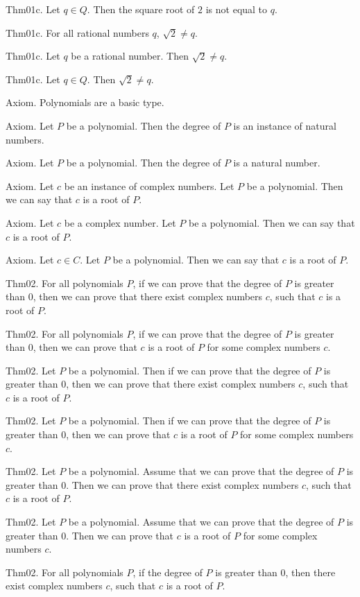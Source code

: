 \documentclass{article}
\begin{document}
Thm01c. Let $q \in Q$. Then the square root of $2$ is not equal to $q$.

Thm01c. For all rational numbers $q$, $\sqrt{ 2}\neq q$.

Thm01c. Let $q$ be a rational number. Then $\sqrt{ 2}\neq q$.

Thm01c. Let $q \in Q$. Then $\sqrt{ 2}\neq q$.

Axiom. Polynomials are a basic type.

Axiom. Let $P$ be a polynomial. Then the degree of $P$ is an instance of natural numbers.

Axiom. Let $P$ be a polynomial. Then the degree of $P$ is a natural number.

Axiom. Let $c$ be an instance of complex numbers. Let $P$ be a polynomial. Then we can say that $c$ is a root of $P$.

Axiom. Let $c$ be a complex number. Let $P$ be a polynomial. Then we can say that $c$ is a root of $P$.

Axiom. Let $c \in C$. Let $P$ be a polynomial. Then we can say that $c$ is a root of $P$.

Thm02. For all polynomials $P$, if we can prove that the degree of $P$ is greater than $0$, then we can prove that there exist complex numbers $c$, such that $c$ is a root of $P$.

Thm02. For all polynomials $P$, if we can prove that the degree of $P$ is greater than $0$, then we can prove that $c$ is a root of $P$ for some complex numbers $c$.

Thm02. Let $P$ be a polynomial. Then if we can prove that the degree of $P$ is greater than $0$, then we can prove that there exist complex numbers $c$, such that $c$ is a root of $P$.

Thm02. Let $P$ be a polynomial. Then if we can prove that the degree of $P$ is greater than $0$, then we can prove that $c$ is a root of $P$ for some complex numbers $c$.

Thm02. Let $P$ be a polynomial. Assume that we can prove that the degree of $P$ is greater than $0$. Then we can prove that there exist complex numbers $c$, such that $c$ is a root of $P$.

Thm02. Let $P$ be a polynomial. Assume that we can prove that the degree of $P$ is greater than $0$. Then we can prove that $c$ is a root of $P$ for some complex numbers $c$.

Thm02. For all polynomials $P$, if the degree of $P$ is greater than $0$, then there exist complex numbers $c$, such that $c$ is a root of $P$.
\end{document}
